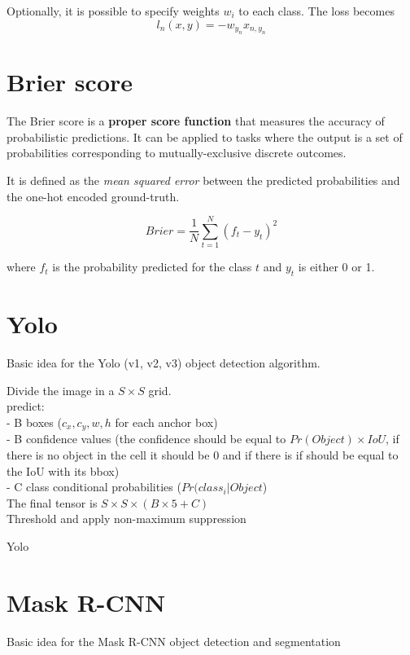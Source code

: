 Optionally, it is possible to specify weights $w_i$ to each class. The loss becomes
\begin{equation}
    l_n(x, y) = -w_{y_n} x_{n, y_n}
\end{equation}

\section{Brier score}
The Brier score is a \textbf{proper score function} that measures the accuracy of probabilistic predictions. It can be applied to tasks where the output is a set of probabilities corresponding to mutually-exclusive discrete outcomes.

It is defined as the \textit{mean squared error} between the predicted probabilities and the one-hot encoded ground-truth.

\begin{equation}
    Brier = \frac{1}{N}\sum_{t=1}^{N} (f_t - y_t)^2
\end{equation}

where $f_t$ is the probability predicted for the class $t$ and $y_t$ is either 0 or 1.


\section{Yolo}
Basic idea for the Yolo (v1, v2, v3) object detection algorithm.

\begin{algorithm}[H]
\DontPrintSemicolon
{}
 Divide the image in a $S\times S$ grid. \\
  { predict: \\
  - B boxes ($c_x, c_y, w, h$ for each anchor box) \\
  - B confidence values (the confidence should be equal to $Pr(Object) \times IoU$, if there is no object in the cell it should be 0 and if there is if should be equal to the IoU with its bbox) \\
  - C class conditional probabilities ($Pr(class_i|Object$) \\}
 The final tensor is $S\times S \times (B \times 5 + C)$ \\
 Threshold and apply non-maximum suppression
\caption{Yolo}
\end{algorithm}


\section{Mask R-CNN}
Basic idea for the Mask R-CNN object detection and segmentation

